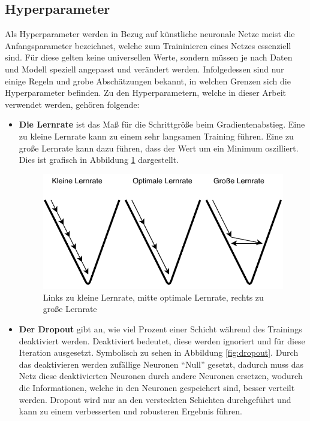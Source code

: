 \subsection{Hyperparameter} \label{sec:Grundlagen_Hyperparamete}
Als Hyperparameter werden in Bezug auf künstliche neuronale Netze meist die Anfangsparameter bezeichnet, welche zum Traininieren eines Netzes essenziell sind. Für diese gelten keine universellen Werte, sondern müssen je nach Daten und Modell speziell angepasst und verändert werden. Infolgedessen sind nur einige Regeln und grobe Abschätzungen bekannt, in welchen Grenzen sich die Hyperparameter befinden. Zu den Hyperparametern, welche in dieser Arbeit verwendet werden, gehören folgende:
\begin{itemize}
\item \textbf{Die Lernrate} ist das Maß für die Schrittgröße beim Gradientenabstieg. Eine zu kleine Lernrate kann zu einem sehr langsamen Training führen. Eine zu große Lernrate kann dazu führen, dass der Wert um ein Minimum oszilliert. Dies ist grafisch in Abbildung \ref{fig:learnrate} dargestellt. \cite[p.~49]{francois2017deep}
\begin{figure}[H]
  \centering  
  \includegraphics[scale=1]{img/learningrate.pdf}
  \caption{Links zu kleine Lernrate, mitte optimale Lernrate, rechts zu große Lernrate}
  \label{fig:learnrate}
\end{figure}

\item \textbf{Der Dropout} gibt an, wie viel Prozent einer Schicht während des Trainings deaktiviert werden. Deaktiviert bedeutet, diese werden ignoriert und für diese Iteration ausgesetzt. Symbolisch zu sehen in Abbildung \ref{fig:dropout}. Durch das deaktivieren werden zufällige Neuronen "`Null"' gesetzt, dadurch muss das Netz diese deaktivierten Neuronen durch andere Neuronen ersetzen, wodurch die Informationen, welche in den Neuronen gespeichert sind, besser verteilt werden. Dropout wird nur an den versteckten Schichten durchgeführt und kann zu einem verbesserten und robusteren Ergebnis führen\cite[p.~109]{francois2017deep}.


\end{itemize}
